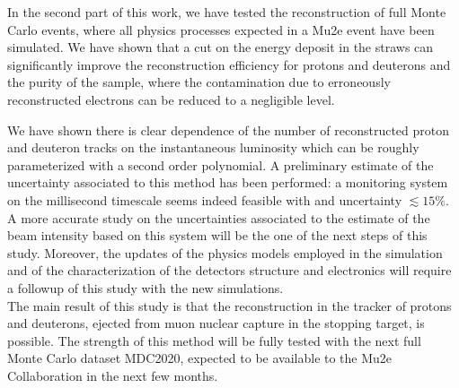 \documentclass[12pt,a4paper,openright, oneside, titlepage]{book} %
\begin{document}
\noindent
In the second part of this work, we have tested the reconstruction of full Monte Carlo events, where all physics processes expected in a Mu2e event have been simulated.
We have shown that a cut on the energy deposit in the straws can significantly improve the reconstruction efficiency for protons and deuterons and the purity of the sample, where the contamination due to erroneously reconstructed electrons can be reduced to a negligible level. 

\noindent 
We have shown there is clear dependence of the number of reconstructed proton and deuteron tracks on the instantaneous luminosity which can be roughly parameterized with a second order polynomial.
A preliminary estimate of the uncertainty associated to this method has been performed: a monitoring system on the millisecond timescale seems indeed feasible with and uncertainty $\lesssim 15 \%$.
A more accurate study on the uncertainties associated to the estimate of the beam intensity based on this system will be the one of the next steps of this study.
Moreover, the updates of the physics models employed in the simulation and of the characterization of the detectors structure and electronics will require a followup of this study with the new simulations. \\
The main result of this study is that the reconstruction in the tracker of protons and deuterons, ejected from muon nuclear capture in the stopping target, is possible.
The strength of this method will be fully tested with the next full Monte Carlo dataset MDC2020, expected to be available to the Mu2e Collaboration in the next few months. 
\end{document}
